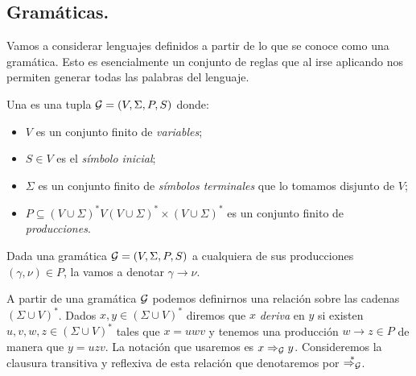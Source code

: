 \documentclass[tesis.tex]{subfiles}
\newcommand{\deriva}{\overset{*}{\Rightarrow_{\cal G}}}
\begin{document}
\begin{center}
	\section{Gramáticas.}
\end{center}
Vamos a considerar lenguajes definidos a partir de lo que se conoce como una gramática. Esto es esencialmente un conjunto de reglas que al irse aplicando nos permiten generar todas las palabras del lenguaje.

\begin{deff}
	Una  es una tupla ${\cal G} = (V, \Sigma, P, S)$ donde:
	\begin{itemize}
		\item $V$ es un conjunto finito de \emph{variables};
		\item $S \in V$ es el \emph{símbolo inicial};
		\item $\Sigma$ es un conjunto finito de \emph{símbolos terminales} que lo tomamos disjunto de $V$;
		\item $P \subseteq (V \cup \Sigma)^*V(V \cup \Sigma)^* \times (V \cup \Sigma)^*$ es un conjunto finito de \emph{producciones}.
	\end{itemize}
\end{deff}

Dada una gramática ${\cal G} = (V, \Sigma, P, S)$ a cualquiera de sus producciones $(\gamma, \nu) \in P$, la vamos a denotar $\gamma \to \nu$. 

A partir de una gramática $\cal G$ podemos definirnos una relación sobre las cadenas $(\Sigma \cup V)^*$. 
Dados $x,y \in (\Sigma \cup V)^*$ diremos que $x$ \emph{deriva} en $y$ si existen $u,v,w,z \in (\Sigma \cup V)^*$ tales que $x = uwv$ y tenemos una producción $w \to z \in P$ de manera que $y=uzv$.
La notación que usaremos es $x \Rightarrow_{\cal G} y$. 
Consideremos la clausura transitiva y reflexiva de esta relación que denotaremos por $\deriva$.

 
\end{document}
